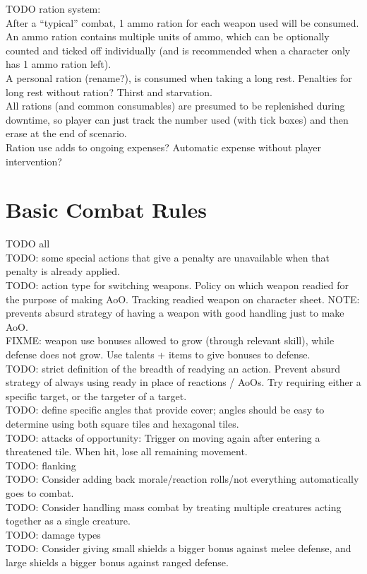 \documentclass[letterpaper,titlepage,openany,twocolumn]{book}
\begin{document}
TODO ration system:\\
	After a “typical” combat, 1 ammo ration for each weapon used will be consumed. An ammo ration contains multiple units of ammo, which can be optionally counted and ticked off individually (and is recommended when a character only has 1 ammo ration left).\\
	A personal ration (rename?), is consumed when taking a long rest. Penalties for long rest without ration? Thirst and starvation.\\
	All rations (and common consumables) are presumed to be replenished during downtime, so player can just track the number used (with tick boxes) and then erase at the end of scenario.\\
	Ration use adds to ongoing expenses? Automatic expense without player intervention?\\

\chapter{Basic Combat Rules}
TODO all\\
TODO: some special actions that give a penalty are unavailable when that penalty is already applied.\\
TODO: action type for switching weapons. Policy on which weapon readied for the purpose of making AoO. Tracking readied weapon on character sheet. NOTE: prevents absurd strategy of having a weapon with good handling just to make AoO.\\
FIXME: weapon use bonuses allowed to grow (through relevant skill), while defense does not grow. Use talents + items to give bonuses to defense.\\
TODO: strict definition of the breadth of readying an action. Prevent absurd strategy of always using ready in place of reactions / AoOs. Try requiring either a specific target, or the targeter of a target.\\
TODO: define specific angles that provide cover; angles should be easy to determine using both square tiles and hexagonal tiles.\\
TODO: attacks of opportunity: Trigger on moving again after entering a threatened tile. When hit, lose all remaining movement.\\
TODO: flanking\\
TODO: Consider adding back morale/reaction rolls/not everything automatically goes to combat.\\
TODO: Consider handling mass combat by treating multiple creatures acting together as a single creature.\\
TODO: damage types\\
TODO: Consider giving small shields a bigger bonus against melee defense, and large shields a bigger bonus against ranged defense.\\
\end{document}

